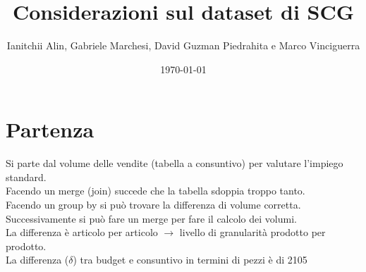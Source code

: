 \documentclass{article}
\title{Considerazioni sul dataset di SCG }
\author{Ianitchii Alin, Gabriele Marchesi, David Guzman Piedrahita e Marco Vinciguerra}
\date{\today}
\begin{document}
\maketitle

\section{Partenza}
Si parte dal volume delle vendite (tabella a consuntivo) per valutare l'impiego standard.
\\Facendo un merge (join) succede che la tabella sdoppia troppo tanto.
\\Facendo un group by si può trovare la differenza di volume corretta.
\\Successivamente si può fare un merge per fare il calcolo dei volumi.
\\La differenza è articolo per articolo $\rightarrow$ livello di granularità prodotto 
per prodotto.
\\La differenza ($\delta$) tra budget e consuntivo in termini di pezzi è di 2105
\end{document}
